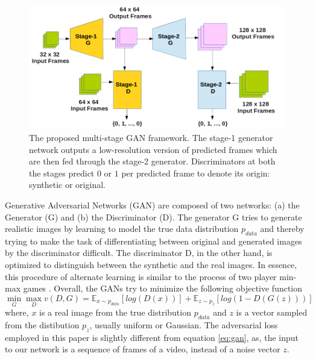 \documentclass{article}
\DeclareMathOperator*{\undermax}{max}
\DeclareMathOperator*{\undermin}{min}
\begin{document}
  \begin{figure}[t]
  	\includegraphics[scale = 0.45]{Images/multi_gan.png}
  	\caption{The proposed multi-stage GAN framework. The stage-1 generator network outputs a low-resolution version of predicted frames which are then fed through the stage-2 generator. Discriminators at both the stages predict $ 0 $ or $ 1 $ per predicted frame to denote its origin: synthetic or original.}
  	\label{fig:gan}
  \end{figure}
  Generative Adversarial Networks (GAN) \cite{goodfellow2014generative} are composed of two networks: (a) the Generator (G) and (b) the Discriminator (D). The generator G tries to generate realistic images by learning to model the true data distribution $ p_{data} $ and thereby trying to make the task of differentiating between original and generated images by the discriminator difficult. The discriminator D, in the other hand, is optimized to distinguish between the synthetic and the real images. In essence, this procedure of alternate learning is similar to the process of two player min-max games \cite{goodfellow2014generative}. Overall, the GANs try to minimize the following objective function
  \begin{equation}
  	\undermin_G \undermax_D v(D, G) = \mathbb{E}_{x \sim p_{data}} [log (D(x))] + \mathbb{E}_{z \sim p_z} [log (1 - D(G(z)))]
  	\label{eq:gan}
  \end{equation}
  where, $ x $ is a real image from the true distribution $ p_{data} $ and $ z $ is a vector sampled from the distibution $ p_z $, usually uniform or Gaussian. The adversarial loss employed in this paper is slightly different from equation \ref{eq:gan}, as, the input to our network is a sequence of frames of a video, instead of a noise vector $ z $. 
  
\end{document}

